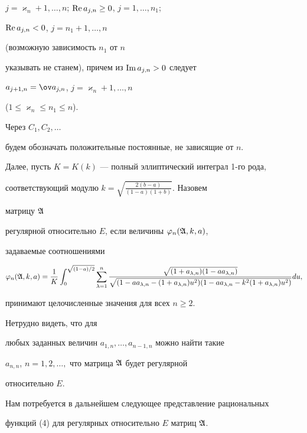 $j=\varkappa_n+1,\dotsc,n$; $\operatorname{Re} a_{j,n}\ge 0$, $j=1,\dotsc,n_1$;


$\operatorname{Re} a_{j,n}<0$, $j=n_1+1,\dotsc,n$


(возможную зависимость $n_1$ от $n$


указывать не станем), причем из $\operatorname{Im} a_{j,n}>0$ следует


$a_{j+1,n}=\ov a_{j,n}$, $j=\varkappa_n+1,\dotsc,n$


($1\le\varkappa_n\le n_1\le n$).


Через $C_1,C_2,\dotsc$


будем обозначать положительные постоянные, не зависящие от $n$.





Далее, пусть $K=K(k)$ --- полный эллиптический интеграл 1-го рода,


соответствующий модулю $k=\sqrt{\frac{2(b-a)}{(1-a)(1+b)}}$. Назовем


матрицу $\frak A$


регулярной относительно $E$, если величины $\varphi_n(\frak A,k,a)$,


задаваемые соотношениями


\begin{equation}


\varphi_n(\frak A,k,a)=\frac{1}{K}


\int^{\sqrt{(1-a)/2}}_0\sum^n_{\lambda=1}


\frac{\sqrt{(1+a_{\lambda,n})(1-a a_{\lambda,n})}}


{\sqrt{(1-a a_{\lambda,n}-(1+a_{\lambda,n})u^2)


(1-a a_{\lambda,n}-k^2(1+a_{\lambda,n})u^2)}}du,


\end{equation}


принимают целочисленные значения для всех $n\ge 2$.


Нетрудно видеть, что для


любых заданных величин $a_{1,n},\dotsc,a_{n-1,n}$ можно найти такие


$a_{n,n}$, $n=1,2,\dotsc,$ что матрица $\frak A$ будет регулярной


относительно $E$.





Нам потребуется в дальнейшем следующее представление рациональных


функций (4) для регулярных относительно $E$ матриц $\frak A$.


